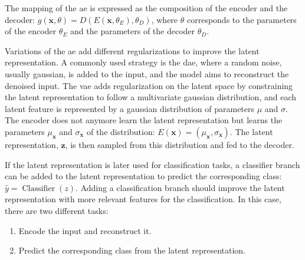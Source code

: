 \documentclass[../main.tex]{subfiles}
\begin{document}
		The mapping of the \gls{ae} is expressed as the composition of the encoder and the decoder: \(g\left(\symbf{x}, \theta\right) = D\left(E\left(\symbf{x}, \theta_E\right), \theta_D\right)\), where \(\theta\) corresponds to the parameters of the encoder \(\theta_E\) and the parameters of the decoder \(\theta_D\).

		Variations of the \gls{ae} add different regularizations to improve the latent representation.
		A commonly used strategy is the \gls{dae}, where a random noise, usually gaussian, is added to the input, and the model aims to reconstruct the denoised input.
		The \gls{vae} adds regularization on the latent space by constraining the latent representation to follow a multivariate gaussian distribution, and each latent feature is represented by a gaussian distribution of parameters \(\mu\) and \(\sigma\).
		The encoder does not anymore learn the latent representation but learns the parameters \(\mu_{\symbf{x}}\) and \(\sigma_{\symbf{x}}\) of the distribution: \(E\left(\symbf{x}\right) = \left(\mu_{\symbf{x}},\sigma_{\symbf{x}}\right) \).
		The latent representation, \(\symbf{z}\), is then sampled from this distribution and fed to the decoder.

		If the latent representation is later used for classification tasks, a classifier branch can be added to the latent representation to predict the corresponding class: \(\hat{y} = \operatorname{Classifier}\left(z\right)\).
		Adding a classification branch should improve the latent representation with more relevant features for the classification.
		In this case, there are two different tasks:
		\begin{enumerate}[nosep]
			\item Encode the input and reconstruct it.
			\item Predict the corresponding class from the latent representation.
		\end{enumerate}
\end{document}
